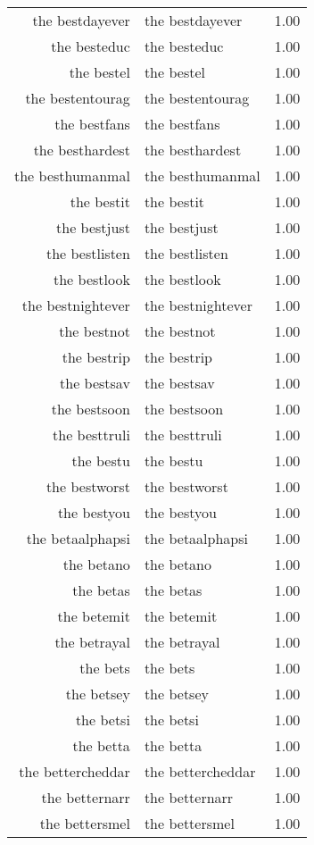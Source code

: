 \begin{table}[ht]
\begin{tabular}{rlr}
  the bestdayever & the bestdayever & 1.00 \\ 
  the besteduc & the besteduc & 1.00 \\ 
  the bestel & the bestel & 1.00 \\ 
  the bestentourag & the bestentourag & 1.00 \\ 
  the bestfans & the bestfans & 1.00 \\ 
  the besthardest & the besthardest & 1.00 \\ 
  the besthumanmal & the besthumanmal & 1.00 \\ 
  the bestit & the bestit & 1.00 \\ 
  the bestjust & the bestjust & 1.00 \\ 
  the bestlisten & the bestlisten & 1.00 \\ 
  the bestlook & the bestlook & 1.00 \\ 
  the bestnightever & the bestnightever & 1.00 \\ 
  the bestnot & the bestnot & 1.00 \\ 
  the bestrip & the bestrip & 1.00 \\ 
  the bestsav & the bestsav & 1.00 \\ 
  the bestsoon & the bestsoon & 1.00 \\ 
  the besttruli & the besttruli & 1.00 \\ 
  the bestu & the bestu & 1.00 \\ 
  the bestworst & the bestworst & 1.00 \\ 
  the bestyou & the bestyou & 1.00 \\ 
  the betaalphapsi & the betaalphapsi & 1.00 \\ 
  the betano & the betano & 1.00 \\ 
  the betas & the betas & 1.00 \\ 
  the betemit & the betemit & 1.00 \\ 
  the betrayal & the betrayal & 1.00 \\ 
  the bets & the bets & 1.00 \\ 
  the betsey & the betsey & 1.00 \\ 
  the betsi & the betsi & 1.00 \\ 
  the betta & the betta & 1.00 \\ 
  the bettercheddar & the bettercheddar & 1.00 \\ 
  the betternarr & the betternarr & 1.00 \\ 
  the bettersmel & the bettersmel & 1.00 \\ 

\end{tabular}
\end{table}
